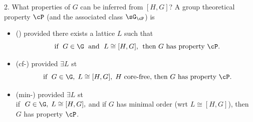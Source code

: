 \begin{frame}[label=IEProps]{2. What properties of $G$ can be inferred from $[H,G]$?}
A group theoretical property $\cP$  (and the associated class $\sG_\cP$) is
\vskip2mm
\begin{itemize}
\item 
{} (\IE) provided there exists a lattice
$L$ such that
\[
\text{ if $\;G\in \G\;$ and $\;L\cong [H,G],\;$  then $G$ has property $\cP$.}
\]
\vskip2mm

\item
{} (cf-\IE) provided
$\exists L$ st
\[
\text{ if $\;G\in \G,\; L\cong [H,G],\;H$ core-free, then $G$ has property $\cP$.}
\]
\vskip2mm

\item 
{} (min-\IE)
provided $\exists L$ st\\ 
if $\;G\in \G,\; L\cong [H,G],$ and if $G$ has minimal order (wrt
$L\cong [H,G]$), then $G$ has property $\cP$.    
\end{itemize}

\end{frame}

